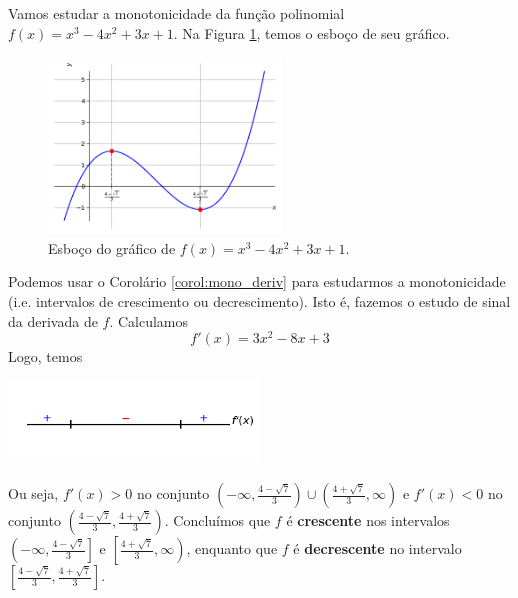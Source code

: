 \cleardoublepage\documentclass[../main.tex]{subfiles}
\begin{document}
\begin{ex}
  Vamos estudar a monotonicidade da função polinomial $f(x) = x^3 - 4x^2 + 3x + 1$. Na Figura \ref{fig:ex_corol_mono_deriv}, temos o esboço de seu gráfico.
  
  \begin{figure}[H]
    \centering
    \includegraphics[width=0.55\textwidth]{./fig_apl_deriv/fig_ex_corol_mono_deriv}
    \caption{Esboço do gráfico de $f(x) = x^3 - 4x^2 + 3x + 1$.}
    \label{fig:ex_corol_mono_deriv}
  \end{figure}

  Podemos usar o Corolário \ref{corol:mono_deriv} para estudarmos a monotonicidade (i.e. intervalos de crescimento ou decrescimento). Isto é, fazemos o estudo de sinal da derivada de $f$. Calculamos
  \begin{equation*}
    f'(x) = 3x^2 - 8x + 3
  \end{equation*}
  Logo, temos
  \begin{center}
    \includegraphics[width=0.5\textwidth]{./fig_apl_deriv/fig_ex_monoderiv_poli}
  \end{center}
  Ou seja, $f'(x) > 0$ no conjunto $\displaystyle \left(-\infty, \frac{4-\sqrt{7}}{3}\right)\cup \left(\frac{4+\sqrt{7}}{3}, \infty\right)$ e $f'(x) < 0$ no conjunto $\displaystyle \left(\frac{4-\sqrt{7}}{3}, \frac{4+\sqrt{7}}{3}\right)$. Concluímos que $f$ é {\bf crescente} nos intervalos $\displaystyle \left(\left.-\infty, \frac{4-\sqrt{7}}{3}\right.\right]$ e $\displaystyle \left[\left.\frac{4+\sqrt{7}}{3}, \infty\right)\right.$, enquanto que $f$ é {\bf decrescente} no intervalo $\displaystyle \left[\frac{4-\sqrt{7}}{3}, \frac{4+\sqrt{7}}{3}\right]$.
\end{ex}
\end{document}
